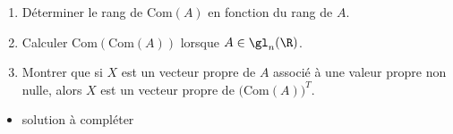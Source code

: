 \begin{enonce}
\begin{exercise}[ID={RMS134 E559},subtitle={Oral
    Mines-Ponts},theme={algebre},annee={2023},concours={mines-ponts},filiere={MP}, difficulty={0}]
  \begin{enumerate}
  \item Déterminer le rang de $\mathrm{Com}(A)$ en fonction du rang de
    $A$.
  \item Calculer $\mathrm{Com}(\mathrm{Com}(A))$ lorsque
    $A\in\gl_n(\R)$.
  \item Montrer que si $X$ est un vecteur propre de $A$ associé à une
    valeur propre non nulle, alors $X$ est un vecteur propre de
    $\big(\mathrm{Com}(A)\big)^T$.
  \end{enumerate}
\end{exercise}
\begin{solution}
  \begin{itemize}
  \item solution à compléter
  \end{itemize}
\end{solution}
\end{enonce}
